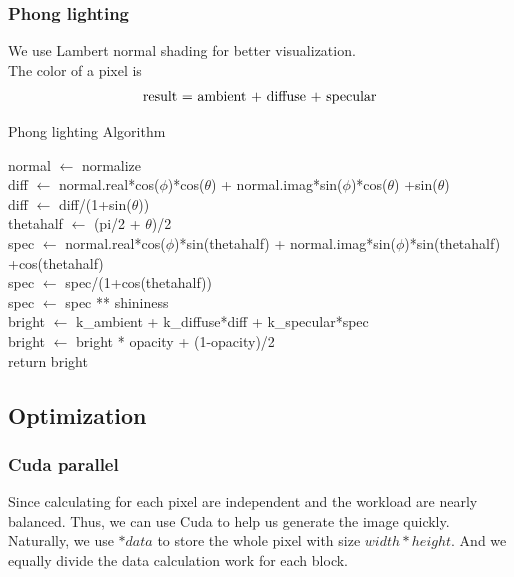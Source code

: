 \documentclass{article}
\begin{document}
        \subsubsection{Phong lighting}
            We use Lambert normal shading for better visualization.\\
            The color of a pixel is 
            $$  \textup{result = ambient + diffuse + specular}$$
            \begin{algorithm}[H]  %
            	\caption{Phong lighting Algorithm}%
            	\LinesNumbered %
            	normal $\leftarrow$ normalize\\
            	diff $\leftarrow$ normal.real*cos($\phi$)*cos($\theta$) +
            	normal.imag*sin($\phi$)*cos($\theta$) +sin($\theta$)\\
            	diff $\leftarrow$ diff/(1+sin($\theta$))\\
            	thetahalf $\leftarrow$ (pi/2 + $\theta$)/2\\
                spec $\leftarrow$ normal.real*cos($\phi$)*sin(thetahalf) +
                         normal.imag*sin($\phi$)*sin(thetahalf) +cos(thetahalf)\\
                spec $\leftarrow$ spec/(1+cos(thetahalf))\\
                spec $\leftarrow$ spec ** shininess \\
                bright $\leftarrow$ k\_ambient + k\_diffuse*diff + k\_specular*spec\\
                bright $\leftarrow$ bright * opacity + (1-opacity)/2 \\
                return bright
            \end{algorithm}

    \subsection{Optimization}
        \subsubsection{Cuda parallel}
            Since calculating for each pixel are independent and the workload are nearly balanced. Thus, we 
            can use Cuda to help us generate the image quickly.\\
            Naturally, we use $*data$ to store the whole pixel with size $width*height$. And we equally divide the 
            data calculation work for each block.\\
    
\end{document}
